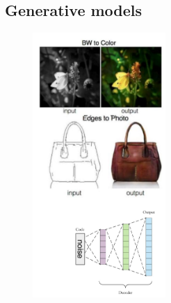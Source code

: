 \subsection{Generative models}
\begin{figure}
	\includegraphics[width=0.45\textwidth]{figure_ml/generative_models.png}
\end{figure} 
\quad
